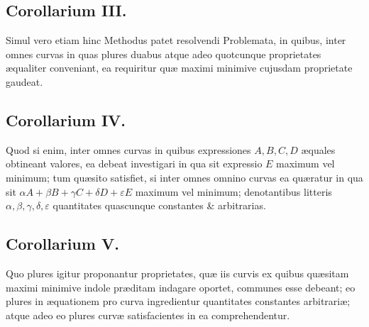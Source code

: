 \subsection*{Corollarium III.}
Simul vero etiam hinc Methodus patet resolvendi Problemata, in quibus, inter omnes curvas in quas plures duabus atque adeo quotcunque proprietates æqualiter conveniant, ea requiritur quæ maximi minimive cujusdam proprietate gaudeat.
\subsection*{Corollarium IV.}
Quod si enim, inter omnes curvas in quibus expressiones $A,B,C,D$ æquales obtineant valores, ea debeat investigari in qua sit expressio $E$ maximum vel minimum; tum quæsito satisfiet, si inter omnes omnino curvas ea quæratur in qua sit $\alpha A+\beta B+\gamma C+\delta D+\varepsilon E$ maximum vel minimum; denotantibus litteris $\alpha,\beta,\gamma,\delta,\varepsilon$ quantitates quascunque constantes \& arbitrarias.
\subsection*{Corollarium V.}
Quo plures igitur proponantur proprietates, quæ iis curvis ex quibus quæsitam maximi minimive indole præditam indagare oportet, communes esse debeant; eo plures in æquationem pro curva ingredientur quantitates constantes arbitrariæ; atque adeo eo plures curvæ satisfacientes in ea comprehendentur.
